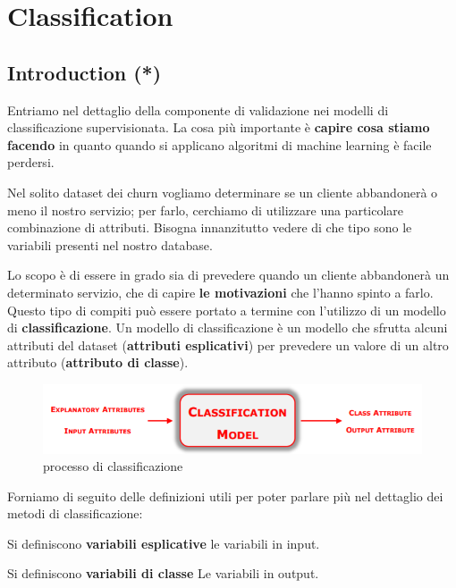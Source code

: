 \section{Classification}

\subsection{Introduction (*)}
Entriamo nel dettaglio della componente di validazione nei modelli di classificazione supervisionata.
La cosa più importante è \textbf{capire cosa stiamo facendo} in quanto quando si applicano algoritmi di machine learning è facile perdersi.

Nel solito dataset dei churn vogliamo determinare se un cliente abbandonerà o meno il nostro servizio; per farlo, cerchiamo di utilizzare una particolare combinazione di attributi. Bisogna innanzitutto vedere di che tipo sono le variabili presenti nel nostro database.

Lo scopo è di essere  in grado sia di prevedere quando un cliente abbandonerà un determinato servizio, che di capire \textbf{le motivazioni} che l'hanno spinto a farlo. Questo tipo di compiti può essere portato a termine con l'utilizzo di un modello di \textbf{classificazione}. Un modello di classificazione è un modello che sfrutta alcuni attributi del dataset (\textbf{attributi esplicativi}) per prevedere un valore di un altro attributo (\textbf{attributo di classe}).

\begin{figure}[H]
	\hspace{-0.5cm}
	\includegraphics[height=0.2 \linewidth]{classification/pict/class_model.png}
	\caption{processo di classificazione}
\end{figure}

Forniamo di seguito delle definizioni utili per poter parlare più nel dettaglio dei metodi di classificazione:
\begin{defn}
	Si definiscono \textbf{variabili esplicative} le variabili in input.
\end{defn}

\begin{defn}
	Si definiscono \textbf{variabili di classe}	Le variabili in output.
\end{defn}

